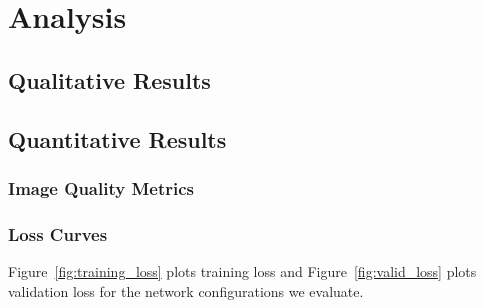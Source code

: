 \section{Analysis}

\subsection{Qualitative Results}




\subsection{Quantitative Results}

\subsubsection{Image Quality Metrics}









\subsubsection{Loss Curves}

Figure~\ref{fig:training_loss} plots training loss and Figure~\ref{fig:valid_loss} plots validation loss for the network configurations we evaluate. 


